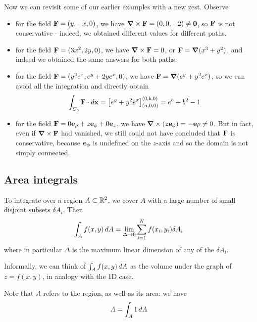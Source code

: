 \documentclass{../template/note}
\begin{document}
    \begin{example*}
        Now we can revisit some of our earlier examples with a new zest. Observe
        \begin{itemize}
            \item for the field \(\V F = (y, -x, 0)\), we have \(\curl \V F = (0, 0, -2) \neq \V 0\), so \(\V F\) is not conservative - indeed, we obtained different values for different paths.
            \item for the field \(\V F = (3x^2, 2y, 0)\), we have \(\curl \V F = 0\), or \(\V F = \grad(x^3 + y^2)\), and indeed we obtained the same answers for both paths.
            \item for the field \(\V F = (y^2e^x, e^y+2ye^x, 0)\), we have \(\V F = \grad(e^y + y^2e^x)\), so we can avoid all the integration and directly obtain
            \begin{align*}
                \int_{C_3} \V F \cdot d \V x = \left[e^y + y^2e^x\right]^{(0, b, 0)}_{(a, 0, 0)} = e^b + b^2 - 1
            \end{align*}
            \item for the field \(\V F = 0 \V e_\rho + z \V e_\phi + 0 \V e_z\), we have \(\curl (z \V e_\phi) = -\V e\rho \neq 0\). But in fact, even if \(\curl \V F\) had vanished, we still could not have concluded that \(\V F\) is conservative, because \(\V e_\phi\) is undefined on the \(z\)-axis and so the domain is not simply connected.            
        \end{itemize}
    \end{example*}
    
    \subsection{Area integrals}

    To integrate over a region \(A \subset \mathbb R^2\), we cover \(A\) with a large number of small disjoint subsets \(\delta A_i\). Then
    \begin{align*}
        \int_A f(x, y) \,d{A} = \lim_{\Delta \to 0} \sum_{i=1}^N f(x_i, y_i) \delta A_i
    \end{align*}
    where in particular \(\Delta\) is the maximum linear dimension of any of the \(\delta A_i\).

    Informally, we can think of \(\int_A f(x, y) \,d{A}\) as the volume under the graph of \(z = f(x, y)\), in analogy with the 1D case.

    Note that \(A\) refers to the region, as well as its area: we have
    \begin{align*}
        A = \int_A 1 \,d{A}
    \end{align*}
    
\end{document}
